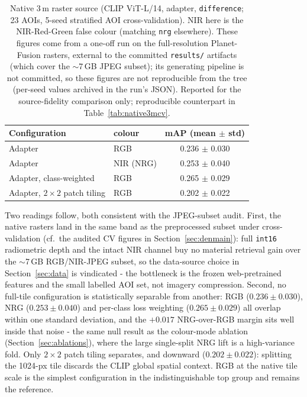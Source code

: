 \documentclass{article}
\begin{document}
\begin{appendices}
\begin{table}[H]
    \centering
    \caption{Native 3\,m raster source (CLIP ViT-L/14, adapter, \texttt{difference};
    23 AOIs, 5-seed stratified AOI cross-validation). NIR here is the
    NIR-Red-Green false colour (matching \texttt{nrg} elsewhere). These figures come
    from a one-off run on the full-resolution Planet-Fusion rasters, external to the
    committed \texttt{results/} artifacts (which cover the $\sim$7\,GB JPEG subset);
    its generating pipeline is not committed, so these figures are not reproducible
    from the tree (per-seed values archived in the run's JSON). Reported for the
    source-fidelity comparison only; reproducible counterpart in
    Table~\ref{tab:native3mcv}.}
    \label{tab:nativeraster}
    \begin{tabular}{llc}
        \toprule
        \textbf{Configuration} & \textbf{colour} & \textbf{mAP (mean $\pm$ std)} \\
        \midrule
        Adapter                & RGB  & 0.236 $\pm$ 0.030 \\
        Adapter                & NIR (NRG)  & 0.253 $\pm$ 0.040 \\
        Adapter, class-weighted & RGB & 0.265 $\pm$ 0.029 \\
        Adapter, $2\times2$ patch tiling & RGB & 0.202 $\pm$ 0.022 \\
        \bottomrule
    \end{tabular}
\end{table}

Two readings follow, both consistent with the JPEG-subset audit. First, the native
rasters land in the same band as the preprocessed subset under cross-validation
(cf.\ the audited CV figures in Section~\ref{sec:denmain}): full \texttt{int16}
radiometric depth and the intact NIR channel buy no material retrieval gain over
the $\sim$7\,GB RGB/NIR-JPEG subset, so the data-source choice in
Section~\ref{sec:data} is vindicated - the bottleneck is the frozen
web-pretrained features and the small labelled AOI set, not imagery compression.
Second, no full-tile configuration is statistically separable from another: RGB
($0.236\pm0.030$), NRG ($0.253\pm0.040$) and per-class loss weighting
($0.265\pm0.029$) all overlap within one standard deviation, and the $+0.017$
NRG-over-RGB margin sits well inside that noise - the same null result as the
colour-mode ablation (Section~\ref{sec:ablations}), where the large single-split
NRG lift is a high-variance fold. Only $2\times2$ patch tiling separates, and
downward ($0.202\pm0.022$): splitting the 1024-px tile discards the CLIP global
spatial context. RGB at the native tile scale is the simplest configuration in the
indistinguishable top group and remains the reference.


\end{appendices}
\end{document}
